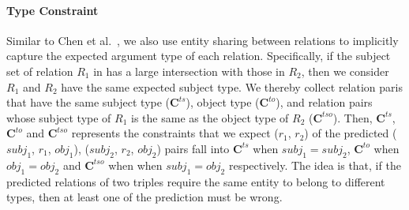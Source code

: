 \paragraph{Type Constraint}
Similar to Chen et al.~, we also use entity sharing between relations to implicitly capture the expected argument type of each relation.
Specifically, if the subject set of relation $R_1$ in \KB has a large intersection with those in $R_2$, then we consider $R_1$ and $R_2$ have the same expected subject type. 
We thereby collect relation paris that have the same subject type ($\bm{C}^{ts}$), object type ($\bm{C}^{to}$), and relation pairs whose subject type of $R_1$ is the same as the object type of $R_2$ ($\bm{C}^{tso}$).
Then, $\bm{C}^{ts}$, $\bm{C}^{to}$ and $\bm{C}^{tso}$ represents the constraints that we expect ($r_1$, $r_2$) of the predicted ($subj_1$, $r_1$, $obj_1$),  ($subj_2$, $r_2$, $obj_2$) pairs fall into $\bm{C}^{ts}$ when $subj_1=subj_2$, $\bm{C}^{to}$ when $obj_1=obj_2$ and $\bm{C}^{tso}$ when when $subj_1=obj_2$ respectively.
The idea is that, if the predicted relations of two triples require the same entity to belong to different types, then at least one of the prediction must be wrong.


